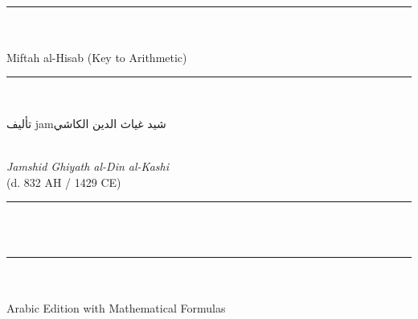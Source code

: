 \documentclass[11pt,a4paper]{book}
\newcommand{\arLarge}[1]{{\Large\arabicfont\beginR #1\endR}}
\newenvironment{arabicbox}{%
  \begin{framed}
  \begin{minipage}{\linewidth-2\fboxsep-2\fboxrule}
  \setlength{\parindent}{0pt}
  \linespread{1.3}\selectfont
}{%
  \end{minipage}
  \end{framed}
}
\newcommand{\longline}{\noindent\rule{\textwidth}{0.4pt}}
\newcommand{\shortline}{\noindent\rule{0.5\textwidth}{0.4pt}\par}
\begin{document}
\thispagestyle{empty}
\begin{center}
\vspace*{1.5cm}

{\fontsize{14}{16}\selectfont{}}\\[0.8cm]

{\color{rulecolor}\longline}\\[0.6cm]

{\fontsize{28}{34}\selectfont\bfseries\color{titlecolor}
}\\[0.5cm]

{\fontsize{18}{22}\selectfont\color{sectioncolor}
Miftah al-Hisab (Key to Arithmetic)}\\[0.3cm]

{\color{rulecolor}\longline}\\[1cm]

\begin{arabicbox}
\begin{center}
\arLarge{تأليف jamشيد غياث الدين الكاشي}
\end{center}
\end{arabicbox}

\vspace{0.8cm}

{\Large{}}\\[0.3cm]
{\Large\textit{Jamshid Ghiyath al-Din al-Kashi}}\\[0.2cm]
{\normalsize (d. 832 AH / 1429 CE)}\\[0.5cm]

{\color{rulecolor}\shortline}

\vspace{0.5cm}

{\small{}}\\[0.2cm]
{\small{}}\\[0.5cm]

{\color{rulecolor}\longline}\\[1cm]

{\footnotesize{}}\\[0.3cm]
{\footnotesize Arabic Edition with Mathematical Formulas}\\[1cm]

\end{center}
\clearpage
\end{document}
